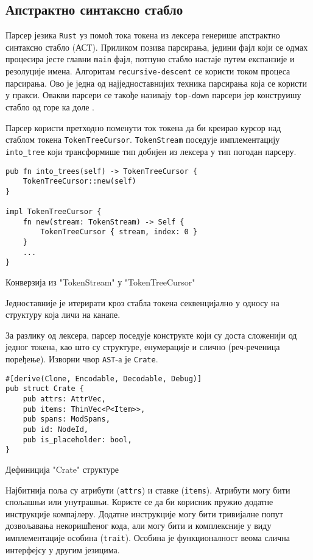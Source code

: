 \subsection{Апстрактно синтаксно стабло}

Парсер језика \verb|Rust| уз помоћ тока токена из лексера генерише апстрактно синтаксно стабло (АСТ). 
Приликом позива парсирања, једини фајл који се одмах процесира јесте главни \verb|main| фајл, потпуно стабло
настаје путем експанзије и резолуције имена.
Алгоритам \verb|recursive-descent| се користи током процеса парсирања. Ово је једна од најједноставнијих
техника парсирања која се користи у пракси. Овакви парсери се такође називају \verb|top-down| парсери 
јер конструишу стабло од горе ка доле \cite{parsing}. 

Парсер користи претходно поменути ток токена да би креирао курсор над стаблом токена \verb|TokenTreeCursor|.
\verb|TokenStream| поседује имплементацију \verb|into_tree| који трансформише тип добијен из лексера
у тип погодан парсеру.

\begin{listing}[H]
\begin{verbatim}
pub fn into_trees(self) -> TokenTreeCursor {
    TokenTreeCursor::new(self)
}

impl TokenTreeCursor {
    fn new(stream: TokenStream) -> Self {
        TokenTreeCursor { stream, index: 0 }
    }
    ...
}
\end{verbatim}
\caption{Конверзија из "TokenStream" у "TokenTreeCursor"}
\end{listing}

Једноставније је итерирати кроз стабла токена секвенцијално у односу на структуру која личи на канапе.

За разлику од лексера, парсер поседује конструкте који су доста сложенији од једног токена, као што су 
структуре, енумерације и слично (реч-реченица поређење). Изворни чвор \verb|AST|-а је \verb|Crate|.

\begin{listing}[H]
\begin{verbatim}
#[derive(Clone, Encodable, Decodable, Debug)]
pub struct Crate {
    pub attrs: AttrVec,
    pub items: ThinVec<P<Item>>,
    pub spans: ModSpans,
    pub id: NodeId,
    pub is_placeholder: bool,
}
\end{verbatim}
\caption{Дефиниција "Crate" структуре}
\end{listing}

Најбитнија поља су атрибути (\verb|attrs|) и ставке (\verb|items|). Атрибути могу бити спољашњи или унутрашњи.
Користе се да би корисник пружио додатне инструкције компајлеру. 
Додатне инструкције могу бити тривијалне попут дозвољавања
некоришћеног кода, али могу бити и комплексније у виду имплементације особина 
(\verb|trait|). Особина је функционалност веома слична интерфејсу у другим језицима. 

